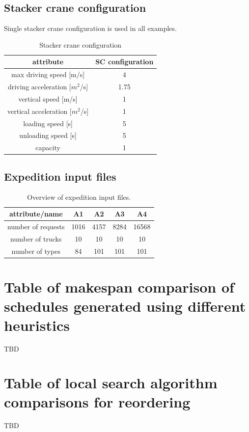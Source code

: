\documentclass{ctuthesis}
\begin{document}
\section{Stacker crane configuration}

Single stacker crane configuration is used in all examples.

\begin{table}[H]
\begin{tabular}{ |c|| c |} 
\hline
attribute & SC configuration\\ 
\hline
max driving speed [m/s] & 4  \\
\hline
driving acceleration [$m^2$/s] & 1.75\\
\hline
vertical speed [m/s] & 1\\
\hline
vertical acceleration [$m^2$/s] & 1\\
\hline
loading speed [s] & 5\\ 
\hline
unloading speed [s] & 5\\ 
\hline
capacity & 1\\ 
\hline
\end{tabular}
\caption{Stacker crane configuration} \label{tab:scconf}
\end{table}

\section{Expedition input files}
\begin{table}[H]
\begin{tabular}{ |c| c c c c|} 
\hline
attribute/name & A1 & A2 & A3 & A4\\ 
\hline
number of requests & 1016 & 4157 & 8284 & 16568 \\
\hline
number of trucks & 10 & 10 & 10 & 10 \\ 
\hline
number of types & 84 & 101 & 101 & 101 \\ 
\hline
\end{tabular}
\caption{Overview of expedition input files.} \label{tab:in2}
\end{table}

\chapter{Table of makespan comparison of schedules generated using different heuristics }
TBD
\chapter{Table of local search algorithm comparisons for reordering}
TBD
\end{document}
